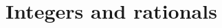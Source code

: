 \chapter{Integers and rationals} \label{ch 4}

\newcommand{\M}{\text{---}}
\newcommand{\D}{\text{//}}





